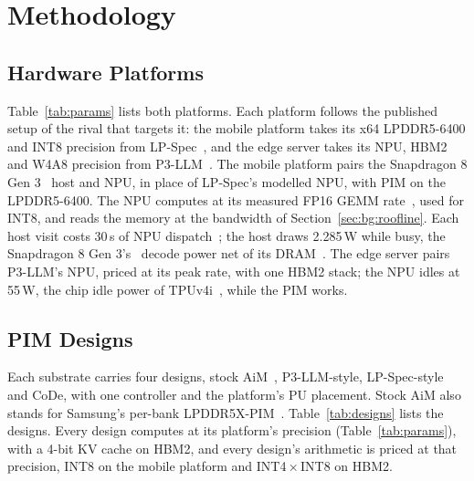 \section{Methodology}
\label{sec:method}
\label{sec:eval:method}%

\subsection{Hardware Platforms}

Table~\ref{tab:params} lists both platforms. Each platform follows the published setup of the rival that targets it: the mobile platform takes its x64
LPDDR5-6400 and INT8 precision from LP-Spec~\cite{lpspec}, and the edge server takes its NPU, HBM2 and W4A8 precision
from P3-LLM~\cite{p3llm}. The mobile platform pairs the Snapdragon 8 Gen 3~\cite{sd8g3} host and NPU, in place of
LP-Spec's modelled NPU, with PIM on the LPDDR5-6400. The NPU computes at its measured FP16 GEMM rate~\cite{hao2025},
used for INT8\ASSUMPTION, and reads the memory at the bandwidth of Section~\ref{sec:bg:roofline}. Each host visit costs
30\,\textmu s of NPU dispatch~\cite{npufaster}\ASSUMPTION; the host draws 2.285\,W while busy,
the Snapdragon 8 Gen 3's~\cite{sd8g3} decode power net of its DRAM~\cite{hao2025,heterollm,tman}\ASSUMPTION. The edge server pairs
P3-LLM's NPU, priced at its peak rate\ASSUMPTION, with one HBM2 stack; the NPU idles at 55\,W, the chip idle power of TPUv4i~\cite{tpuv4i},
while the PIM works\ASSUMPTION.

\begin{table}[t]
  \caption{Platform parameters.}
  \label{tab:params}
  \centering
  \footnotesize
  \setlength{\tabcolsep}{2.2pt}
  
  \vspace{-5pt}
\end{table}

\subsection{PIM Designs}
\label{sec:method:designs}
Each substrate carries four designs, stock AiM~\cite{aimjssc}, P3-LLM-style, LP-Spec-style and CoDe, with one
controller and the platform's PU placement. Stock AiM also stands for Samsung's per-bank
LPDDR5X-PIM~\cite{lp5xpim}. Table~\ref{tab:designs} lists the designs. Every design computes at its
platform's precision (Table~\ref{tab:params}), with a 4-bit KV cache on HBM2, and every design's arithmetic is
priced at that precision, INT8 on the mobile platform and INT4\,$\times$\,INT8 on HBM2\ASSUMPTION.

